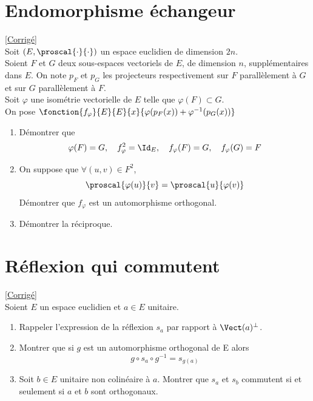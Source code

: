 \documentclass[8pt]{book}
\begin{document}
\section{Endomorphisme échangeur}
\label{Endomorphisme échangeur}
\textcolor{blue}{\hyperref[Endomorphisme échangeur corrigé]{[Corrigé]}}\\
Soit $(E,\proscal{\cdot}{\cdot})$ un espace euclidien de dimension $2n$.\\
Soient $F$ et $G$ deux sous-espaces vectoriels de $E$, de dimension $n$, supplémentaires dans $E$. On note $p_F$ et $p_G$ les projecteurs respectivement sur $F$ parallèlement à $G$ et sur $G$ parallèlement à $F$.\\
Soit $\varphi$ une isométrie vectorielle de $E$ telle que $\varphi(F)\subset G$.\\
On pose $\fonction{f_\varphi}{E}{E}{x}{\varphi(p_F(x))+\varphi^{-1}(p_G(x))}$
\begin{enumerate}
	\item Démontrer que
	$$\varphi(F)=G,\quad f_\varphi^2=\Id_E,\quad f_\varphi(F)=G,\quad f_\varphi(G)=F$$
	\item On suppose que $\forall (u,v)\in F^2$,
	$$\proscal{\varphi(u)}{v}=\proscal{u}{\varphi(v)}$$
	Démontrer que $f_\varphi$ est un automorphisme orthogonal.
	\item Démontrer la réciproque.
\end{enumerate}

\section{Réflexion qui commutent}
\label{Réflexion qui commutent}
\textcolor{blue}{\hyperref[Réflexion qui commutent corrigé]{[Corrigé]}}\\
Soient $E$ un espace euclidien et $a\in E$ unitaire.
\begin{enumerate}
	\item Rappeler l'expression de la réflexion $s_a$ par rapport à $\Vect(a)^\bot$.
	\item Montrer que si $g$ est un automorphisme orthogonal de E alors
	$$g\circ s_a\circ g^{-1}=s_{g(a)}$$
	\item Soit $b\in E$ unitaire non colinéaire à $a$. Montrer que $s_a$ et $s_b$ commutent si et seulement si $a$ et $b$ sont orthogonaux.
\end{enumerate}
\end{document}
